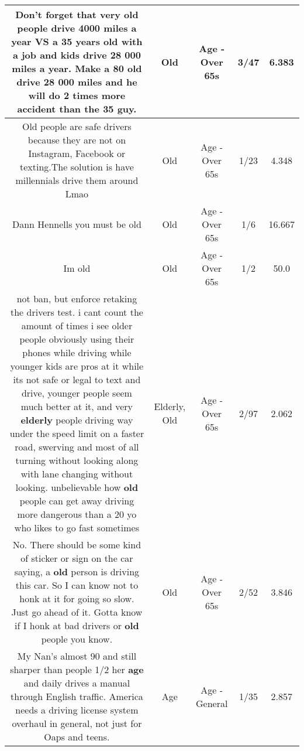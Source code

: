 \documentclass[11pt]{article}
\newlength\mylength
\begin{document}
\begin{center}
\begin{longtable}{|C{.65\mylength}|C{.30\mylength}|C{.12\mylength}|C{.12\mylength}|C{.12\mylength}|}
  \small Don't forget that very \textbf{old} people drive 4000 miles a year VS a 35 years \textbf{old} with a job and kids drive 28 000 miles a year. Make a 80 \textbf{old} drive 28 000 miles and he will do 2 times more accident than the 35 guy.\normalsize   & Old & Age - Over 65s & 3/47 & 6.383 \\  \hline
  \small Old people are safe drivers because they are not on Instagram,  Facebook or texting.The solution is have millennials drive them around Lmao\normalsize   & Old & Age - Over 65s & 1/23 & 4.348 \\  \hline
  \small Dann Hennells you must be old\normalsize   & Old & Age - Over 65s & 1/6 & 16.667 \\  \hline
  \small Im old\normalsize   & Old & Age - Over 65s & 1/2 & 50.0 \\  \hline
  \small not ban, but enforce retaking the drivers test. i cant count the amount of times i see older people obviously using their phones while driving while younger kids are pros at it while its not safe or legal to text and drive, younger people seem much better at it, and very \textbf{elderly} people driving way under the speed limit on a faster road, swerving and most of all turning without looking along with lane changing without looking. unbelievable how \textbf{old} people can get away driving more dangerous than a 20 yo who likes to go fast sometimes\normalsize   & Elderly, Old & Age - Over 65s & 2/97 & 2.062 \\  \hline
  \small No. There should be some kind of sticker or sign on the car saying, a \textbf{old} person is driving this car. So I can know not to honk at it for going so slow. Just go ahead of it. Gotta know if I honk at bad drivers or \textbf{old} people you know.\normalsize   & Old & Age - Over 65s & 2/52 & 3.846 \\  \hline
  \small My Nan's almost 90 and still sharper than people 1/2 her \textbf{age} and daily drives a manual through English traffic. America needs a driving license system overhaul in general, not just for Oaps and teens.\normalsize   & Age & Age - General & 1/35 & 2.857 \\  \hline

\end{longtable}
\end{center}
\end{document}
